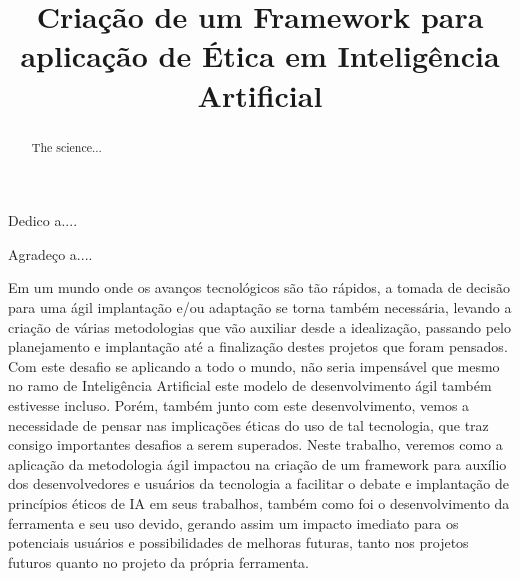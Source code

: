 \documentclass[licenciatura]{unb-cic}
\title{Criação de um Framework para aplicação de Ética em Inteligência Artificial}
\begin{document}
  \maketitle
  \pretextual

  \begin{dedicatoria}
  Dedico a....
  \end{dedicatoria}

  \begin{agradecimentos}
  Agradeço a....
  \end{agradecimentos}

  \begin{resumo}
  Em um mundo onde os avanços tecnológicos são tão rápidos, a tomada de decisão para uma ágil implantação e/ou adaptação se torna também necessária, levando a criação de várias metodologias que vão auxiliar desde a idealização, passando pelo planejamento e implantação até a finalização destes projetos que foram pensados. Com este desafio se aplicando a todo o mundo, não seria impensável que mesmo no ramo de Inteligência Artificial este modelo de desenvolvimento ágil também estivesse incluso. Porém, também junto com este desenvolvimento, vemos a necessidade de pensar nas implicações éticas do uso de tal tecnologia, que traz consigo importantes desafios a serem superados. Neste trabalho, veremos como a aplicação da metodologia ágil impactou na criação de um framework para auxílio dos desenvolvedores e usuários da tecnologia a facilitar o debate e implantação de princípios éticos de IA em seus trabalhos, também como foi o desenvolvimento da ferramenta e seu uso devido, gerando assim um impacto imediato para os potenciais usuários e possibilidades de melhoras futuras, tanto nos projetos futuros quanto no projeto da própria ferramenta. 
  \end{resumo}

  \begin{abstract}
  The science...
  \end{abstract}

  \tableofcontents
  \listoffigures
  \listoftables

  \textual
  
  
  

  \postextual
  
  
\end{document}
